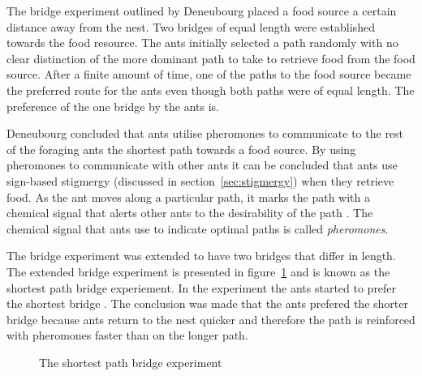 The bridge experiment outlined by Deneubourg placed a food source a certain distance away from the nest\cite{AntsAndStigmergy,CompuIntelligenceIntro}. Two bridges of equal length were established towards the food resource. The ants initially selected a path randomly with no clear distinction of the more dominant path to take to retrieve food from the food source\cite{AntsAndStigmergy,CompuIntelligenceIntro}. After a finite amount of time, one of the paths to the food source became the preferred route for the ants even though both paths were of equal length. The preference of the one bridge by the ants is.

Deneubourg concluded that ants utilise pheromones to communicate to the rest of the foraging ants the shortest path towards a food source.\cite{FundamentalSwarm} By using pheromones to communicate with other ants it can be concluded that ants use sign-based stigmergy (discussed in section~\ref{sec:stigmergy}) when they retrieve food\cite{AntIntroTrends,AntsAndStigmergy,CompuIntelligenceIntro}. As the ant moves along a particular path, it marks the path with a chemical signal that alerts other ants to the desirability of the path \cite{CompuIntelligenceIntro}. The chemical signal that ants use to indicate optimal paths is called \emph{pheromones}\cite{AntsAndStigmergy,CompuIntelligenceIntro}.

The bridge experiment was extended to have two bridges that differ in length. The extended bridge experiment is presented in figure~\ref{fig:antBridgeExperiment} and is known as the shortest path bridge experiement\cite{FundamentalSwarm}. In the experiment the ants started to prefer the shortest bridge \cite{FundamentalSwarm}. The conclusion was made that the ants prefered the shorter bridge because ants return to the nest quicker and therefore the path is reinforced with pheromones faster than on the longer path\cite{FundamentalSwarm}.

\begin{figure}[H]
	\centering
	\setlength \fboxsep{0pt}
	\setlength \fboxrule{0.5pt}
	\caption{The shortest path bridge experiment \cite{AntsAndStigmergy}}
	\label{fig:antBridgeExperiment}
\end{figure}

